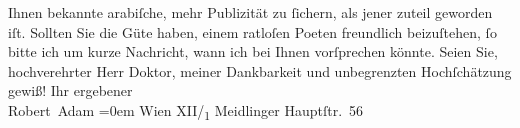 \begin{ledgroupsized}[t]{13cm}
               Ihnen bekannte arabiſche, mehr
               Publizität zu ſichern, als jener zuteil geworden iſt.\pend
           \pstart
           Sollten Sie die Güte haben, einem ratloſen Poeten freundlich beizuſtehen, ſo bitte
               ich um kurze Nachricht, wann ich bei Ihnen vorſprechen könnte.\pend
           \pstart
           Seien Sie, hochverehrter Herr Doktor, meiner Dankbarkeit und unbegrenzten
               Hochſchätzung gewiß!\pend
           \pstart
           Ihr ergebener{\\[\baselineskip]}\spacefill\mbox{Robert Adam}\pend
           \leftskip=0em{}\pstart
           \noindent{}Wien XII/\textsubscript{1} Meidlinger
                     Hauptſtr. 56\pend
           
         
         \endnumbering{}\end{ledgroupsized}  \newcommand{\dateiname}{L01972}\newcommand{\titel}{Robert Adam an Arthur Schnitzler, 29. 10. 1910}\newcommand{\editorInnen}{Martin Anton Müller und Gerd-Hermann Susen}
      